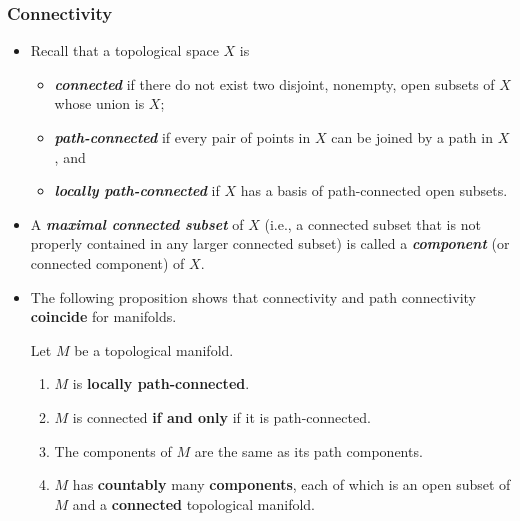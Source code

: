 \documentclass[11pt]{article}
\begin{document}
\subsubsection{Connectivity}
\begin{itemize}
\item \begin{definition}
Recall that a topological space $X$ is
\begin{itemize}
\item \emph{\textbf{connected}} if there do not exist two disjoint, nonempty, open subsets of $X$ whose union is $X$;
\item \emph{\textbf{path-connected}} if every pair of points in $X$ can be joined by a path in $X$, and
\item \emph{\textbf{locally path-connected}} if $X$ has a basis of path-connected open subsets.
\end{itemize}
\end{definition}

\item \begin{definition}
A \emph{\textbf{maximal connected subset}} of $X$ (i.e., a connected subset that is not properly contained in any larger connected subset) is called a \emph{\textbf{component}} (or connected component) of $X$.
\end{definition}

\item The following proposition shows that connectivity and path connectivity \textbf{coincide} for manifolds.
\begin{proposition}
Let $M$ be a topological manifold.
\begin{enumerate}
\item $M$ is \textbf{locally path-connected}.
\item $M$ is connected \textbf{if and only} if it is path-connected.
\item The components of $M$ are the same as its path components.
\item $M$ has \textbf{countably} many \textbf{components}, each of which is an open subset of $M$ and a \textbf{connected} topological manifold.
\end{enumerate}
\end{proposition}
\end{itemize}
\end{document}
